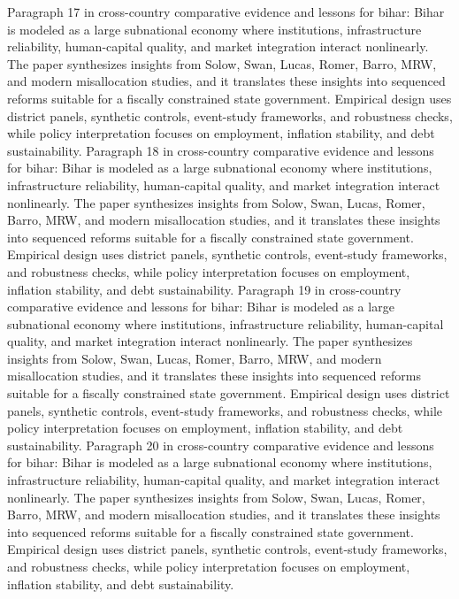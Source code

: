 \documentclass[preprint,12pt]{elsarticle}
\begin{document}
Paragraph 17 in cross-country comparative evidence and lessons for bihar: Bihar is modeled as a large subnational economy where institutions, infrastructure reliability, human-capital quality, and market integration interact nonlinearly. The paper synthesizes insights from Solow, Swan, Lucas, Romer, Barro, MRW, and modern misallocation studies, and it translates these insights into sequenced reforms suitable for a fiscally constrained state government. Empirical design uses district panels, synthetic controls, event-study frameworks, and robustness checks, while policy interpretation focuses on employment, inflation stability, and debt sustainability.
Paragraph 18 in cross-country comparative evidence and lessons for bihar: Bihar is modeled as a large subnational economy where institutions, infrastructure reliability, human-capital quality, and market integration interact nonlinearly. The paper synthesizes insights from Solow, Swan, Lucas, Romer, Barro, MRW, and modern misallocation studies, and it translates these insights into sequenced reforms suitable for a fiscally constrained state government. Empirical design uses district panels, synthetic controls, event-study frameworks, and robustness checks, while policy interpretation focuses on employment, inflation stability, and debt sustainability.
Paragraph 19 in cross-country comparative evidence and lessons for bihar: Bihar is modeled as a large subnational economy where institutions, infrastructure reliability, human-capital quality, and market integration interact nonlinearly. The paper synthesizes insights from Solow, Swan, Lucas, Romer, Barro, MRW, and modern misallocation studies, and it translates these insights into sequenced reforms suitable for a fiscally constrained state government. Empirical design uses district panels, synthetic controls, event-study frameworks, and robustness checks, while policy interpretation focuses on employment, inflation stability, and debt sustainability.
Paragraph 20 in cross-country comparative evidence and lessons for bihar: Bihar is modeled as a large subnational economy where institutions, infrastructure reliability, human-capital quality, and market integration interact nonlinearly. The paper synthesizes insights from Solow, Swan, Lucas, Romer, Barro, MRW, and modern misallocation studies, and it translates these insights into sequenced reforms suitable for a fiscally constrained state government. Empirical design uses district panels, synthetic controls, event-study frameworks, and robustness checks, while policy interpretation focuses on employment, inflation stability, and debt sustainability.
\end{document}

